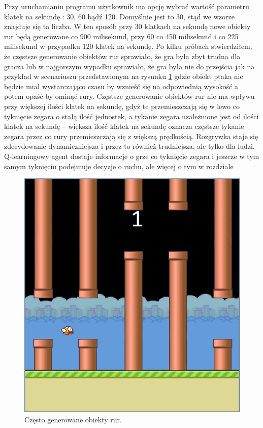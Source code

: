 \documentclass[a4paper, 12pt,oneside]{book}
\begin{document}
Przy uruchamianiu programu użytkownik ma opcję wybrać wartość parametru 
klatek na sekundę : 30, 60 bądź 120. Domyślnie jest to 30, stąd we wzorze
znajduje się ta liczba. W ten sposób przy 30 klatkach na sekundę nowe obiekty
rur będą generowane co 900 milisekund, przy 60 co 450 milisekund i co 225
milisekund w przypadku 120 klatek na sekundę. Po kilku próbach stwierdziłem,
że częstsze generowanie obiektów rur sprawiało, że gra była zbyt trudna dla
gracza lub w najgorszym wypadku sprawiało, że gra była nie do przejścia
jak na przykład w scenariuszu przedstawionym na rysunku \ref{frequent_pipes}
gdzie obiekt ptaka nie będzie miał wystarczająco czasu by wznieść się na 
odpowiednią wysokość a potem opaść by ominąć rury. Częstsze generowanie 
obiektów rur nie ma wpływu przy większej ilości klatek na sekundę, gdyż te
przemieszczają się w lewo co tyknięcie zegara o stałą ilość jednostek, a
tykanie zegara uzależnione jest od ilości klatek na sekundę -- większa ilość
klatek na sekundę oznacza częstsze tykanie zegara przez co rury przemieszczają
się z większą prędkością. Rozgrywka staje się zdecydowanie dynamiczniejsza
i przez to również trudniejsza, ale tylko dla ludzi. Q-learningowy agent
dostaje informacje o grze co tyknięcie zegara i jeszcze w tym samym tyknięciu
podejmuje decyzje o ruchu, ale więcej o tym w rozdziale
\begin{figure}
	\begin{center}
		\includegraphics[scale=0.50]{impossible_pipes.png}
		\caption{Często generowane obiekty rur.}
		\label{frequent_pipes}
	\end{center}
\end{figure}
\end{document}
